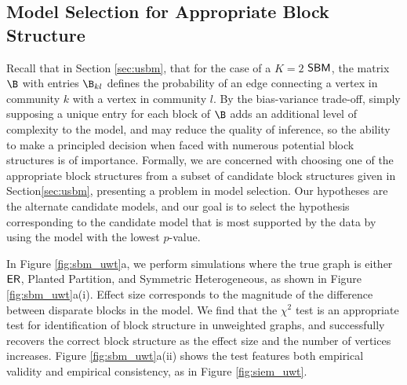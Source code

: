 \subsection{Model Selection for Appropriate Block Structure}
\label{sec:sbm_block_est}

Recall that in Section \ref{sec:usbm}, that for the case of a $K=2$ $\operatorname{\mathsf{SBM}}$, the matrix $\B$ with entries $\B_{kl}$ defines the probability of an edge connecting a vertex in community $k$ with a vertex in community $l$. By the bias-variance trade-off, simply supposing a unique entry for each block of $\B$ adds an additional level of complexity to the model, and may reduce the quality of inference, so the ability to make a principled decision when faced with numerous potential block structures is of importance. Formally, we are concerned with choosing one of the appropriate block structures from a subset of candidate block structures given in Section\ref{sec:usbm}, presenting a problem in model selection. Our hypotheses are the alternate candidate models, and our goal is to select the hypothesis corresponding to the candidate model that is most supported by the data by using the model with the lowest $p$-value.

In Figure \ref{fig:sbm_uwt}a, we perform simulations where the true graph is either $\operatorname{\mathsf{ER}}$, Planted Partition, and Symmetric Heterogeneous, as shown in Figure \ref{fig:sbm_uwt}a(i). Effect size corresponds to the magnitude of the difference between disparate blocks in the model. We find that the $\chi^2$ test %
is an appropriate test for identification of block structure in unweighted graphs, and successfully recovers the correct block structure as the effect size and the number of vertices increases. Figure \ref{fig:sbm_uwt}a(ii) shows the test features both empirical validity and empirical consistency, as in Figure \ref{fig:siem_uwt}. 

